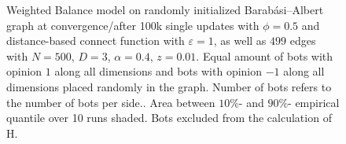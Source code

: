\documentclass[11pt]{article}
\begin{document}
\begin{figure}[htb!]
\caption{Weighted Balance model on randomly initialized Barabási–Albert graph at convergence/after 100k single updates with $\phi=0.5$ and distance-based connect function with $\varepsilon=1$, as well as $499$ edges with $N=500$, $D=3$, $\alpha=0.4$, $z=0.01$. Equal amount of bots with opinion $1$ along all dimensions and bots with opinion $-1$ along all dimensions placed randomly in the graph. Number of bots refers to the number of bots per side.. Area between $10\%$- and $90\%$- empirical quantile over 10 runs shaded. Bots excluded from the calculation of H.
}
\label{bots dynamic_double}
\end{figure}
\end{document}
